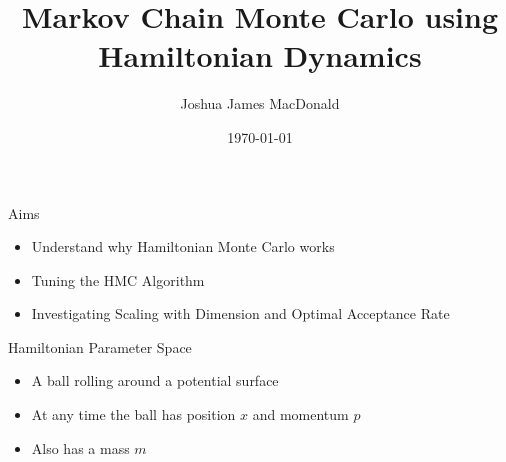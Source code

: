 \documentclass{beamer}
\title[MCMC using Hamiltonian Dynamics]{Markov Chain Monte Carlo using Hamiltonian Dynamics}
\author{Joshua James MacDonald}
\institute{}
\date{\today}
\begin{document}
\beamertemplatenavigationsymbolsempty

\begin{frame}
  \titlepage
\end{frame}





\begin{frame}{Aims}

\begin{itemize}

\item Understand why Hamiltonian Monte Carlo works \vskip 5mm

\item Tuning the HMC Algorithm \vskip 5mm

\item Investigating Scaling with Dimension and Optimal Acceptance Rate 
\end{itemize}

\end{frame}





\begin{frame}{Hamiltonian Parameter Space}
\begin{itemize}
\item A ball rolling around a potential surface \vskip 5mm
\item At any time the ball has position $x$ and momentum $p$ \vskip 5mm
\item Also has a mass $m$ \vskip 5mm
\end{itemize}
\end{frame}
\end{document}
